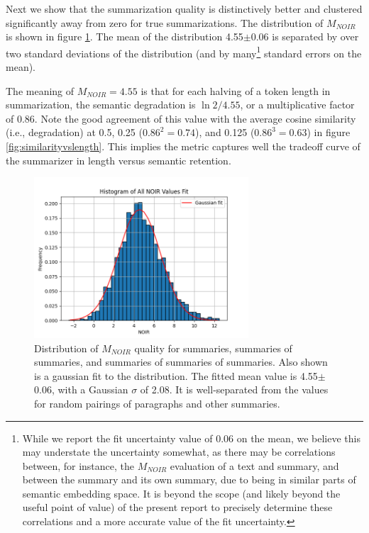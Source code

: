 \documentclass{article}
\begin{document}
{Next we show that the summarization quality is distinctively better and clustered significantly away from zero for true summarizations.
The distribution of $M_{NOIR}$ is shown in figure \ref{fig:mNOIR}.
The mean of the distribution 4.55$\pm$0.06 is separated by over two standard deviations of the distribution (and by many\footnote{While we report the fit uncertainty value of 0.06 on the mean, we believe this may understate the uncertainty somewhat, as there may be correlations between, for instance, the $M_{NOIR}$ evaluation of a text and summary, and between the summary and its own summary, due to being in similar parts of semantic embedding space. It is beyond the scope (and likely beyond the useful point of value) of the present report to precisely determine these correlations and a more accurate value of the fit uncertainty.} standard errors on the mean).

The meaning of $M_{NOIR}=4.55$ is that for each halving of a token length in summarization, the semantic degradation is $\ln{2}/4.55$, or a multiplicative factor of 0.86.  
Note the good agreement of this value with the average cosine similarity (i.e., degradation) at 0.5, 0.25 ($0.86^2=0.74$), and 0.125 ($0.86^3=0.63$) in figure \ref{fig:similarityvslength}.
This implies the metric captures well the tradeoff curve of the summarizer in length versus semantic retention.

\begin{figure}
	\centering
	\includegraphics[height=6cm]{Histogram_of_All_NOIR_Values_Fit.png}
	\caption{Distribution of $M_{NOIR}$ quality for summaries, summaries of summaries, and summaries of summaries of summaries.  Also shown is a gaussian fit to the distribution.  The fitted mean value is 4.55$\pm$0.06, with a Gaussian $\sigma$ of 2.08.  It is well-separated from the values for random pairings of paragraphs and other summaries.}
	\label{fig:mNOIR}
\end{figure}

}
\end{document}
